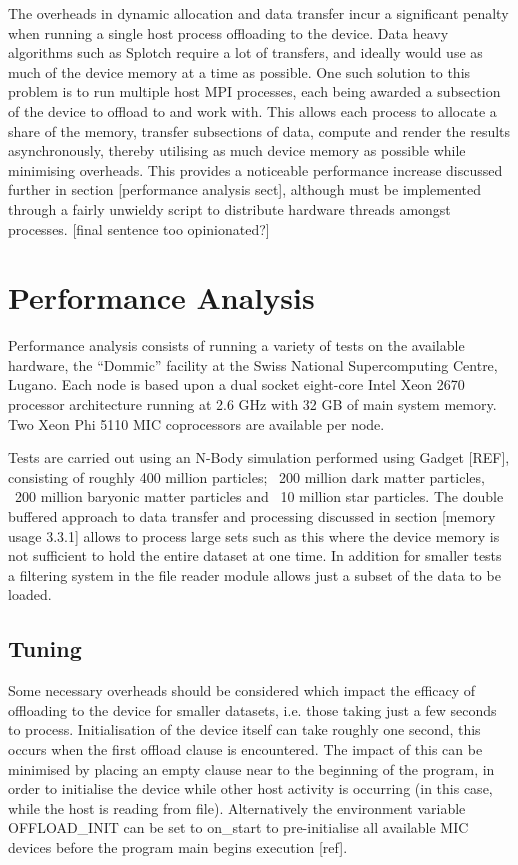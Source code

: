 \documentclass[runningheads,a4paper]{llncs}
\begin{document}
The overheads in dynamic allocation and data transfer incur a significant penalty when running a single host process 
offloading to the device. Data heavy algorithms such as Splotch require a lot of transfers, and ideally would use 
as much of the device memory at a time as possible. One such solution to this problem is to run multiple host MPI 
processes, each being awarded a subsection of the device to offload to and work with. This allows each process to 
allocate a share of the memory, transfer subsections of data, compute and render the results asynchronously, thereby 
utilising as much device memory as possible while minimising overheads. This provides a noticeable performance increase 
discussed further in section [performance analysis sect], although must be implemented through a fairly unwieldy script 
to distribute hardware threads amongst processes. [final sentence too opinionated?]


\section{Performance Analysis}
\label{sect:performance}

Performance analysis consists of running a variety of tests on the available hardware, the “Dommic” facility at the 
Swiss National Supercomputing Centre, Lugano. Each node is based upon  a dual socket eight-core Intel Xeon 2670 
processor architecture running at 2.6 GHz with 32 GB of main system memory. Two Xeon Phi 5110 MIC coprocessors are 
available per node. 

Tests are carried out using an N-Body simulation performed using Gadget [REF], consisting of roughly 400 million 
particles;  ~200 million dark matter particles, ~200 million baryonic matter particles and ~10 million star particles. 
The double buffered approach to data transfer and processing discussed in section [memory usage 3.3.1] allows to 
process large sets such as this where the device memory is not sufficient to hold the entire dataset at one time. In 
addition for smaller tests a filtering system in the file reader module allows just a subset of the data to be loaded.



\subsection{Tuning}
\label{sect:tuning}

Some necessary overheads should be considered which impact the efficacy of offloading to the device for smaller datasets, 
i.e. those taking just a few seconds to process. Initialisation of the device itself can take roughly one second, this 
occurs when the first offload clause is encountered. The impact of this can be minimised by placing an empty clause near 
to the beginning of the program, in order to initialise the device while other host activity is occurring (in this case, 
while the host is reading from file). Alternatively the environment variable OFFLOAD\_INIT can be set to on\_start to 
pre-initialise all available MIC devices before the program main begins execution [ref]. 
\end{document}

